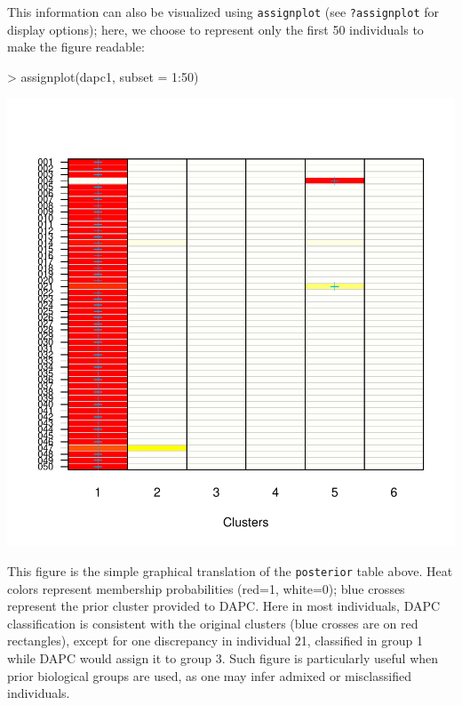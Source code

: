 \documentclass{article}
\begin{document}
This information can also be visualized using \texttt{assignplot} (see \texttt{?assignplot} for display
options); here, we choose to represent only the first 50 individuals to make the figure readable:
\begin{Schunk}
\begin{Sinput}
> assignplot(dapc1, subset = 1:50)
\end{Sinput}
\end{Schunk}
\includegraphics{figs/dapc-022}

\noindent
This figure is the simple graphical translation of the \texttt{posterior} table above. Heat colors
represent membership probabilities
(red=1, white=0); blue crosses represent the prior cluster provided to DAPC.
Here in most individuals, DAPC classification is consistent with the original
clusters (blue crosses are on red rectangles), except for one discrepancy in individual 21, classified
in group 1 while DAPC would assign it to group 3.
Such figure is particularly useful when prior biological groups are used, as one may infer admixed
or misclassified individuals.
\\
\end{document}

